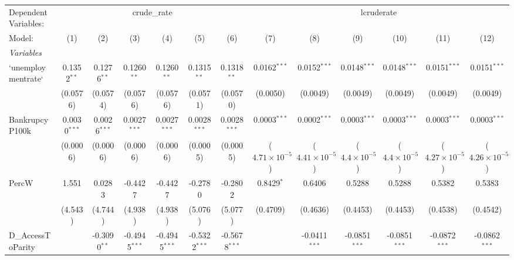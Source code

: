 
\begingroup
\centering
\begin{tabular}{lcccccccccccc}
   \tabularnewline \midrule \midrule
   Dependent Variables: & \multicolumn{6}{c}{crude\_rate} & \multicolumn{6}{c}{lcruderate}\\
   Model:                & (1)            & (2)            & (3)             & (4)             & (5)             & (6)             & (7)                     & (8)                     & (9)                    & (10)                   & (11)                    & (12)\\  
   \midrule
   \emph{Variables}\\
   `unemploymentrate`    & 0.1352$^{**}$  & 0.1276$^{**}$  & 0.1260$^{**}$   & 0.1260$^{**}$   & 0.1315$^{**}$   & 0.1318$^{**}$   & 0.0162$^{***}$          & 0.0152$^{***}$          & 0.0148$^{***}$         & 0.0148$^{***}$         & 0.0151$^{***}$          & 0.0151$^{***}$\\   
                         & (0.0576)       & (0.0574)       & (0.0576)        & (0.0576)        & (0.0571)        & (0.0570)        & (0.0050)                & (0.0049)                & (0.0049)               & (0.0049)               & (0.0049)                & (0.0049)\\   
   BankrupcyP100k        & 0.0030$^{***}$ & 0.0026$^{***}$ & 0.0027$^{***}$  & 0.0027$^{***}$  & 0.0028$^{***}$  & 0.0028$^{***}$  & 0.0003$^{***}$          & 0.0002$^{***}$          & 0.0003$^{***}$         & 0.0003$^{***}$         & 0.0003$^{***}$          & 0.0003$^{***}$\\   
                         & (0.0006)       & (0.0006)       & (0.0006)        & (0.0006)        & (0.0005)        & (0.0005)        & ($4.71\times 10^{-5}$)  & ($4.41\times 10^{-5}$)  & ($4.4\times 10^{-5}$)  & ($4.4\times 10^{-5}$)  & ($4.27\times 10^{-5}$)  & ($4.26\times 10^{-5}$)\\    
   PercW                 & 1.551          & 0.0283         & -0.4427         & -0.4427         & -0.2780         & -0.2802         & 0.8429$^{*}$            & 0.6406                  & 0.5288                 & 0.5288                 & 0.5382                  & 0.5383\\   
                         & (4.543)        & (4.744)        & (4.938)         & (4.938)         & (5.076)         & (5.077)         & (0.4709)                & (0.4636)                & (0.4453)               & (0.4453)               & (0.4538)                & (0.4542)\\   
   D\_AccessToParity     &                & -0.3090$^{**}$ & -0.4945$^{***}$ & -0.4945$^{***}$ & -0.5322$^{***}$ & -0.5678$^{***}$ &                         & -0.0411$^{***}$         & -0.0851$^{***}$        & -0.0851$^{***}$        & -0.0872$^{***}$         & -0.0862$^{***}$\\   

\end{tabular}
